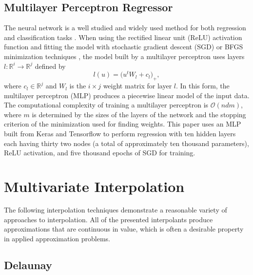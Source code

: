 \documentclass[smallextended,final]{svjour3}  %
\begin{document}
\subsection{Multilayer Perceptron Regressor}
\label{sec:mlp}
The neural network is a well studied and widely used method for both
regression and classification tasks
\cite{rumelhart1988learning,hornik1989multilayer}. When using the
rectified linear unit (ReLU) activation function
\cite{dahl2013improving} and fitting the model with stochastic
gradient descent (SGD) or BFGS minimization techniques
\cite{goh2017why,moller1993scaled,robbins1951stochastic}, the model
built by a multilayer perceptron uses layers $l : \mathbb{R}^{i}
\rightarrow \mathbb{R}^{j}$ defined by
 $$ l(u) = \bigl( u^t W_l + c_l \bigr)_+ ,$$
where $c_l \in \mathbb{R}^j$ and $W_l$ is the $i \times j$ weight
matrix for layer $l$. In this form, the multilayer perceptron (MLP)
produces a piecewise linear model of the input data. The computational
complexity of training a multilayer perceptron is $\mathcal{O}(n d
m)$, where $m$ is determined by the sizes of the layers of the network
and the stopping criterion of the minimization used for finding
weights. This paper uses an MLP built from Keras and Tensorflow to
perform regression \cite{tensorflow2015-whitepaper,chollet2015keras}
with ten hidden layers each having thirty two nodes (a total of
approximately ten thousand parameters), ReLU activation, and five
thousand epochs of SGD for training.

\section{Multivariate Interpolation}
\label{sec:interpolation}
The following interpolation techniques demonstrate a reasonable
variety of approaches to interpolation. All of the presented
interpolants produce approximations that are continuous in value,
which is often a desirable property in applied approximation problems.

\subsection{Delaunay}
\label{sec:delaunay}
\end{document}
